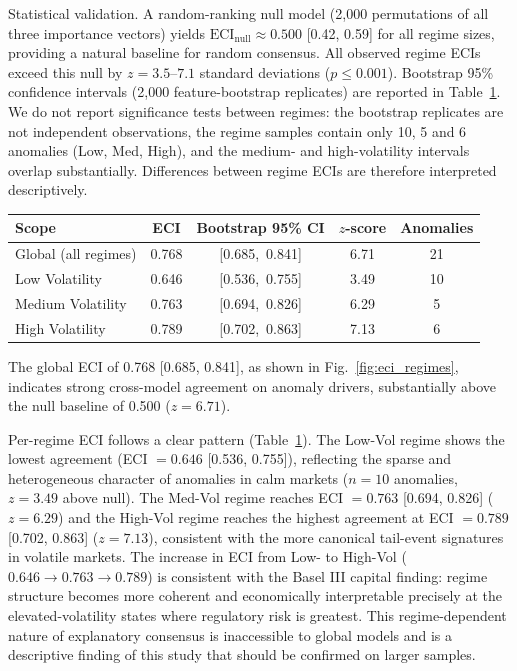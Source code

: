 \documentclass[]{interact}
\begin{document}
Statistical validation. A random-ranking null model (2{,}000 permutations of all three importance vectors) yields $\mathrm{ECI}_\text{null} \approx 0.500$ [0.42, 0.59] for all regime sizes, providing a natural baseline for random consensus. All observed regime ECIs exceed this null by $z = 3.5$--$7.1$ standard deviations ($p \leq 0.001$). Bootstrap 95\% confidence intervals (2{,}000 feature-bootstrap replicates) are reported in Table~\ref{tab:eci_regimes}. We do not report significance tests between regimes: the bootstrap replicates are not independent observations, the regime samples contain only 10, 5 and 6 anomalies (Low, Med, High), and the medium- and high-volatility intervals overlap substantially. Differences between regime ECIs are therefore interpreted descriptively.


\begin{table}[H]
{\renewcommand{\arraystretch}{1.25}
\setlength{\tabcolsep}{5pt}
\begin{tabular}{lcccc}
\toprule
\textbf{Scope} & \textbf{ECI} & \textbf{Bootstrap 95\% CI} & \textbf{$z$-score} & \textbf{Anomalies} \\
\midrule
Global (all regimes) & 0.768 & [0.685,\ 0.841] & 6.71 & 21 \\
\midrule
Low Volatility       & 0.646 & [0.536,\ 0.755] & 3.49 & 10 \\
Medium Volatility    & 0.763 & [0.694,\ 0.826] & 6.29 & 5 \\
High Volatility      & 0.789 & [0.702,\ 0.863] & 7.13 & 6 \\
\bottomrule
\end{tabular}}
\label{tab:eci_regimes}
\end{table}
The global ECI of 0.768 [0.685, 0.841], as shown in Fig.~\ref{fig:eci_regimes}, indicates strong cross-model agreement on anomaly drivers, substantially above the null baseline of 0.500 ($z=6.71$). 

Per-regime ECI follows a clear pattern (Table~\ref{tab:eci_regimes}). The Low-Vol regime shows the lowest agreement (ECI $= 0.646$ [0.536, 0.755]), reflecting the sparse and heterogeneous character of anomalies in calm markets ($n = 10$ anomalies, $z = 3.49$ above null). The Med-Vol regime reaches ECI $= 0.763$ [0.694, 0.826] ($z = 6.29$) and the High-Vol regime reaches the highest agreement at ECI $= 0.789$ [0.702, 0.863] ($z = 7.13$), consistent with the more canonical tail-event signatures in volatile markets. The increase in ECI from Low- to High-Vol ($0.646 \rightarrow 0.763 \rightarrow 0.789$) is consistent with the Basel III capital finding: regime structure becomes more coherent and economically interpretable precisely at the elevated-volatility states where regulatory risk is greatest. This regime-dependent nature of explanatory consensus is inaccessible to global models and is a descriptive finding of this study that should be confirmed on larger samples.
\end{document}
